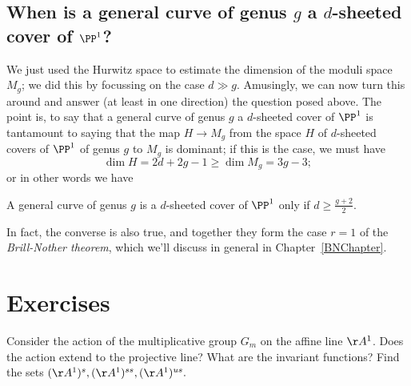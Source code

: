 \subsection{When is a general curve of genus $g$ a $d$-sheeted cover of $\PP^1$?}

We just used the Hurwitz space to estimate the dimension of the moduli space $M_g$; we did this by focussing on the case $d \gg  g$. Amusingly, we can now turn this around and answer (at least in one direction) the question posed above. The point is, to say that a general curve of genus $g$ a $d$-sheeted cover of $\PP^1$ is tantamount to saying that the map $H \to M_g$ from the space $H$ of $d$-sheeted covers of $\PP^1$ of genus $g$ to $M_g$ is dominant; if this is the case, we must have
$$
\dim H = 2d+2g-1 \geq \dim M_g = 3g-3;
$$
or in other words we have

\begin{corollary}\label{BN dim 1}
A general curve of genus $g$ is a $d$-sheeted cover of $\PP^1$ only if $d \geq \frac{g+2}{2}$.
\end{corollary}

In fact, the converse is also true, and together they form the case $r=1$ of the \emph{Brill-Nother theorem}, which we'll discuss in general in Chapter~\ref{BNChapter}. 

\section{Exercises}

\begin{exercise}
Consider the action of the multiplicative group $G_m$ on the affine line $\AA^1$. Does the action extend
to the projective line? What are the invariant functions? Find the sets $(\AA^1)^s, (\AA^1)^{ss}, (\AA^1)^{us}.$
\end{exercise}


